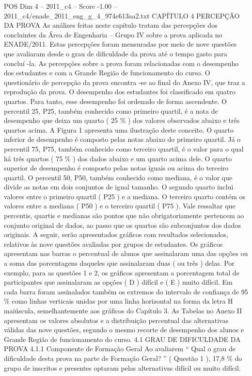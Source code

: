 \begin{textsample}{POS Dim 4 – 2011\_c4 – Score -1.00 – 2011\_c4/enade\_2011\_eng\_g\_4\_974c613aa2.txt}  \label{ex:f4_pos_238}
CAPÍTULO 4 PERCEPÇÃO DA PROVA As análises feitas neste capítulo tratam das percepções dos concluintes da Área de Engenharia – Grupo IV sobre a prova aplicada no ENADE/2011.
Estas percepções foram mensuradas por meio de nove questões que avaliaram desde o grau de dificuldade da prova até o tempo gasto para concluí -la.
As percepções sobre a prova foram relacionadas com o desempenho dos estudantes e com a Grande Região de funcionamento do curso.
O questionário de percepção da prova encontra -se ao final do Anexo IV, que traz a reprodução da prova.
O desempenho dos estudantes foi classificado em quatro quartos.
Para tanto, esse desempenho foi ordenado de forma ascendente.
O percentil 25, P25, também conhecido como primeiro quartil, é a nota de desempenho que deixa um quarto ( 25 \% ) dos valores observados abaixo e três quartos acima.
A Figura 1 apresenta uma ilustração deste conceito.
O quarto inferior de desempenho é composto pelas notas abaixo do primeiro quartil.
Já o percentil 75, P75, também conhecido como terceiro quartil, é o valor para o qual há três quartos ( 75 \% ) dos dados abaixo e um quarto acima dele.
O quarto superior de desempenho é composto pelas notas iguais ou acima do terceiro quartil.
O percentil 50, P50, também conhecido como mediana, é o valor que divide as notas em dois conjuntos de igual tamanho.
O segundo quarto inclui valores entre o primeiro quartil ( P25 ) e a mediana.
O terceiro quarto contém os valores entre a mediana ( P50 ) e o terceiro quartil ( P75 ).
Vale ressaltar que percentis, quartis e medianas são pontos que não obrigatoriamente pertencem ao conjunto original de dados, ao passo que os quartos são subconjuntos dos dados originais.
A seguir, serão apresentados gráficos com resultados selecionados, relativos às nove questões avaliadas por grupos de estudantes.
Os gráficos apresentam nas barras o percentual de alunos que assinalaram uma das opções ou a soma das porcentagens daqueles que assinalaram duas ( ou três ) delas.
Por exemplo, para as questões 1 e 2, os gráficos apresentam a porcentagem total de participantes que assinalaram as opções ( D ) difícil e ( E ) muito difícil.
Em cada barra foram assinalados também os extremos do intervalo de confiança de 95 \% como linhas verticais unidas por uma linha horizontal na forma da letra H maiúscula, semelhantemente aos gráficos do Capítulo 3.
As Tabelas no Anexo II apresentam os valores absolutos e a distribuição percentual das alternativas válidas das nove questões, segundo o mesmo recorte de desempenho dos alunos e Grande Região de funcionamento do curso. 4.1 GRAU DE DIFICULDADE DA PROVA 4.1.1 Componente de Formação Geral Ao avaliarem “ Qual o grau de dificuldade desta prova na parte de Formação Geral? ” ( Questão 1 ), 17,8 \% do grupo de inscritos e presentes optaram pelas alternativas difícil ou muito difícil.

\end{textsample}
